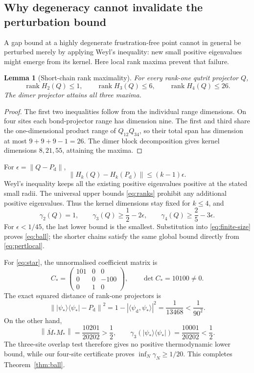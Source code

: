 \documentclass[11pt,a4paper]{article}
\newtheorem{lemma}[theorem]{Lemma}
\theoremstyle{remark}\newtheorem{remark}[theorem]{Remark}
\newcommand{\ket}[1]{\lvert #1\rangle}
\newcommand{\bra}[1]{\langle #1\rvert}
\newcommand{\norm}[1]{\left\lVert #1\right\rVert}
\newcommand{\rank}{\operatorname{rank}}
\newcommand{\Pd}{P_{\mathrm d}}
\begin{document}
\subsection{Why degeneracy cannot invalidate the perturbation bound}
A gap bound at a highly degenerate frustration-free point cannot in general be perturbed merely by applying Weyl's inequality: new small positive eigenvalues might emerge from its kernel. Here local rank maxima prevent that failure.

\begin{lemma}[Short-chain rank maximality]\label{lem:rankmax}
For every rank-one qutrit projector $Q$,
\begin{equation}\label{eq:ranks}
 \rank H_2(Q)\le1,\qquad \rank H_3(Q)\le6,\qquad \rank H_4(Q)\le26.
\end{equation}
The dimer projector attains all three maxima.
\end{lemma}
\begin{proof}
The first two inequalities follow from the individual range dimensions. On four sites each bond-projector range has dimension nine. The first and third share the one-dimensional product range of $Q_{12}Q_{34}$, so their total span has dimension at most $9+9+9-1=26$. The dimer block decomposition gives kernel dimensions $8,21,55$, attaining the maxima.
\end{proof}

For $\epsilon=\norm{Q-\Pd}$,
\[
 \norm{H_k(Q)-H_k(\Pd)}\le(k-1)\epsilon.
\]
Weyl's inequality keeps all the existing positive eigenvalues positive at the stated small radii. The universal upper bounds \eqref{eq:ranks} prohibit any additional positive eigenvalues. Thus the kernel dimensions stay fixed for $k\le4$, and
\begin{equation}\label{eq:pertlocal}
 \gamma_2(Q)=1,\qquad
 \gamma_3(Q)\ge\frac12-2\epsilon,\qquad
 \gamma_4(Q)\ge\frac25-3\epsilon.
\end{equation}
For $\epsilon<1/45$, the last lower bound is the smallest. Substitution into \eqref{eq:finite-size} proves \eqref{eq:ball}; the shorter chains satisfy the same global bound directly from \eqref{eq:pertlocal}.

For \eqref{eq:star}, the unnormalised coefficient matrix is
\[
 C_* =\begin{pmatrix}101&0&0\\0&0&-100\\0&1&0\end{pmatrix},
 \qquad \det C_*=10100\ne0.
\]
The exact squared distance of rank-one projectors is
\[
 \norm{\ket{\psi_*}\bra{\psi_*}-\Pd}^2
 =1-|\langle\psi_{\mathrm d},\psi_*\rangle|^2
 =\frac1{13468}<\frac1{90^2}.
\]
On the other hand,
\[
 \norm{\overline M_*M_*}=\frac{10201}{20202}>\frac12,
 \qquad \gamma_3(\ket{\psi_*}\bra{\psi_*})=\frac{10001}{20202}<\frac12.
\]
The three-site overlap test therefore gives no positive thermodynamic lower bound, while our four-site certificate proves $\inf_N\gamma_N\ge1/20$. This completes Theorem~\ref{thm:ball}.
\end{document}

